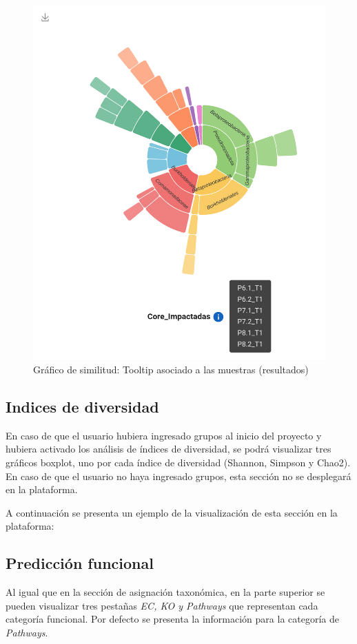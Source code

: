 \begin{figure}[H]
    \includegraphics[width=0.8\linewidth]{images/app/results/core_tooltip.png}

    \caption{Gráfico de similitud: Tooltip asociado a las muestras (resultados)}
    \label{fig:app-results-core-tooltip}
\end{figure}

\subsection{Indices de diversidad}

En caso de que el usuario hubiera ingresado grupos al inicio del proyecto y hubiera activado los análisis de índices de diversidad, se podrá visualizar tres gráficos boxplot, uno por cada índice de diversidad (Shannon, Simpson y Chao2). En caso de que el usuario no haya ingresado grupos, esta sección no se desplegará en la plataforma.

A continuación se presenta un ejemplo de la visualización de esta sección en la plataforma:



\subsection{Predicción funcional}
Al igual que en la sección de asignación taxonómica, en la parte superior se pueden visualizar tres pestañas \textit{EC, KO y Pathways} que representan cada categoría funcional. Por defecto se presenta la información para la categoría de \textit{Pathways}.

